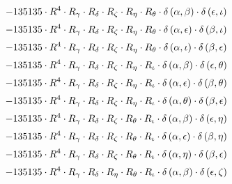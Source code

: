 \begin{subequations}
\begin{gather}
 \\[0.2em] \notag 		 - 135135 \cdot R^{4} \cdot R_{\gamma{}} \cdot R_{\delta{}} \cdot R_{\zeta{}} \cdot R_{\eta{}} \cdot R_{\theta{}} \cdot \delta{}\left(\alpha{}, \beta{}\right) \cdot \delta{}\left(\epsilon{}, \iota{}\right) 
 \\[0.2em] \notag 		 - 135135 \cdot R^{4} \cdot R_{\gamma{}} \cdot R_{\delta{}} \cdot R_{\zeta{}} \cdot R_{\eta{}} \cdot R_{\theta{}} \cdot \delta{}\left(\alpha{}, \epsilon{}\right) \cdot \delta{}\left(\beta{}, \iota{}\right) 
 \\[0.2em] \notag 		 - 135135 \cdot R^{4} \cdot R_{\gamma{}} \cdot R_{\delta{}} \cdot R_{\zeta{}} \cdot R_{\eta{}} \cdot R_{\theta{}} \cdot \delta{}\left(\alpha{}, \iota{}\right) \cdot \delta{}\left(\beta{}, \epsilon{}\right) 
 \\[0.2em] \notag 		 - 135135 \cdot R^{4} \cdot R_{\gamma{}} \cdot R_{\delta{}} \cdot R_{\zeta{}} \cdot R_{\eta{}} \cdot R_{\iota{}} \cdot \delta{}\left(\alpha{}, \beta{}\right) \cdot \delta{}\left(\epsilon{}, \theta{}\right) 
 \\[0.2em] \notag 		 - 135135 \cdot R^{4} \cdot R_{\gamma{}} \cdot R_{\delta{}} \cdot R_{\zeta{}} \cdot R_{\eta{}} \cdot R_{\iota{}} \cdot \delta{}\left(\alpha{}, \epsilon{}\right) \cdot \delta{}\left(\beta{}, \theta{}\right) 
 \\[0.2em] \notag 		 - 135135 \cdot R^{4} \cdot R_{\gamma{}} \cdot R_{\delta{}} \cdot R_{\zeta{}} \cdot R_{\eta{}} \cdot R_{\iota{}} \cdot \delta{}\left(\alpha{}, \theta{}\right) \cdot \delta{}\left(\beta{}, \epsilon{}\right) 
 \\[0.2em] \notag 		 - 135135 \cdot R^{4} \cdot R_{\gamma{}} \cdot R_{\delta{}} \cdot R_{\zeta{}} \cdot R_{\theta{}} \cdot R_{\iota{}} \cdot \delta{}\left(\alpha{}, \beta{}\right) \cdot \delta{}\left(\epsilon{}, \eta{}\right) 
 \\[0.2em] \notag 		 - 135135 \cdot R^{4} \cdot R_{\gamma{}} \cdot R_{\delta{}} \cdot R_{\zeta{}} \cdot R_{\theta{}} \cdot R_{\iota{}} \cdot \delta{}\left(\alpha{}, \epsilon{}\right) \cdot \delta{}\left(\beta{}, \eta{}\right) 
 \\[0.2em] \notag 		 - 135135 \cdot R^{4} \cdot R_{\gamma{}} \cdot R_{\delta{}} \cdot R_{\zeta{}} \cdot R_{\theta{}} \cdot R_{\iota{}} \cdot \delta{}\left(\alpha{}, \eta{}\right) \cdot \delta{}\left(\beta{}, \epsilon{}\right) 
 \\[0.2em] \notag 		 - 135135 \cdot R^{4} \cdot R_{\gamma{}} \cdot R_{\delta{}} \cdot R_{\eta{}} \cdot R_{\theta{}} \cdot R_{\iota{}} \cdot \delta{}\left(\alpha{}, \beta{}\right) \cdot \delta{}\left(\epsilon{}, \zeta{}\right) 

\end{gather}
\end{subequations}
